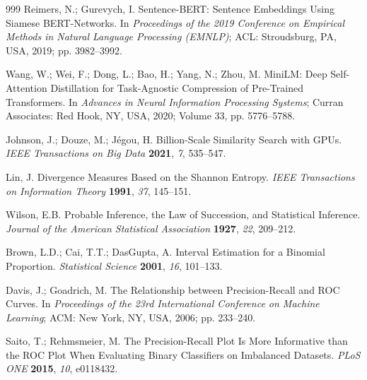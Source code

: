 \begin{thebibliography}{999}
Reimers, N.; Gurevych, I. Sentence-BERT: Sentence Embeddings Using Siamese BERT-Networks. In
\textit{Proceedings of the 2019 Conference on Empirical Methods in Natural Language Processing
(EMNLP)}; ACL: Stroudsburg, PA, USA, 2019; pp. 3982--3992.

Wang, W.; Wei, F.; Dong, L.; Bao, H.; Yang, N.; Zhou, M. MiniLM: Deep Self-Attention
Distillation for Task-Agnostic Compression of Pre-Trained Transformers. In \textit{Advances in
Neural Information Processing Systems}; Curran Associates: Red Hook, NY, USA, 2020; Volume 33,
pp. 5776--5788.

Johnson, J.; Douze, M.; J\'egou, H. Billion-Scale Similarity Search with GPUs. \textit{IEEE
Transactions on Big Data} \textbf{2021}, \textit{7}, 535--547.

Lin, J. Divergence Measures Based on the Shannon Entropy. \textit{IEEE Transactions on
Information Theory} \textbf{1991}, \textit{37}, 145--151.

Wilson, E.B. Probable Inference, the Law of Succession, and Statistical Inference.
\textit{Journal of the American Statistical Association} \textbf{1927}, \textit{22}, 209--212.

Brown, L.D.; Cai, T.T.; DasGupta, A. Interval Estimation for a Binomial Proportion.
\textit{Statistical Science} \textbf{2001}, \textit{16}, 101--133.

Davis, J.; Goadrich, M. The Relationship between Precision-Recall and ROC Curves. In
\textit{Proceedings of the 23rd International Conference on Machine Learning}; ACM: New York,
NY, USA, 2006; pp. 233--240.

Saito, T.; Rehmsmeier, M. The Precision-Recall Plot Is More Informative than the ROC Plot When
Evaluating Binary Classifiers on Imbalanced Datasets. \textit{PLoS ONE} \textbf{2015},
\textit{10}, e0118432.

\end{thebibliography}
